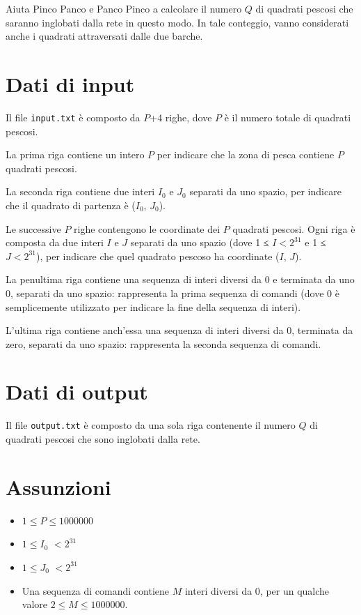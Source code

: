 \documentclass[a4paper,11pt]{article}
\begin{document}
Aiuta Pinco Panco e Panco Pinco a calcolare il numero $Q$ di
quadrati pescosi che saranno inglobati dalla rete in questo
modo. In tale conteggio, vanno considerati anche i quadrati
attraversati dalle due barche.


\section*{Dati di input}
  Il file \texttt{input.txt} è composto da $P$+4
  righe, dove $P$ è il numero totale di quadrati
  pescosi.

La prima riga contiene un intero $P$ per indicare che la zona
di pesca contiene $P$ quadrati pescosi.

La seconda riga contiene due interi $I_{0}$ e
$J_{0}$ separati da uno spazio, per indicare che il
quadrato di partenza è ($I_{0}$,
$J_{0}$).

Le successive $P$ righe contengono le coordinate dei
$P$ quadrati pescosi. Ogni riga è composta da due
interi $I$ e $J$ separati da uno spazio (dove 1 ≤
$I < 2^{31}$ e 1 ≤ $J <
2^{31}$), per indicare che quel quadrato pescoso ha
coordinate ($I$, $J$).

La penultima riga contiene una sequenza di interi diversi da 0 e
terminata da uno 0, separati da uno spazio: rappresenta la prima
sequenza di comandi (dove 0 è semplicemente utilizzato per
indicare la fine della sequenza di interi).

L'ultima riga contiene anch'essa una sequenza di interi diversi da 0,
terminata da zero, separati da uno spazio: rappresenta la seconda
sequenza di comandi.


\section*{Dati di output}
  
Il file \texttt{output.txt} è composto da una sola riga
contenente il numero $Q$ di quadrati pescosi che sono
inglobati dalla rete.

  \section*{Assunzioni}
  \begin{itemize}
  
    \item $1 ≤ P ≤ 1 000 000$
    \item $1 ≤ I_{0}$ $< 2^{31}$ 
    \item $1 ≤ J_{0}$ $< 2^{31}$ 
    \item Una sequenza di comandi contiene $M$ interi diversi da 0,
per un qualche valore $2 ≤ M ≤ 1 000 000$.
  \end{itemize}
\end{document}
